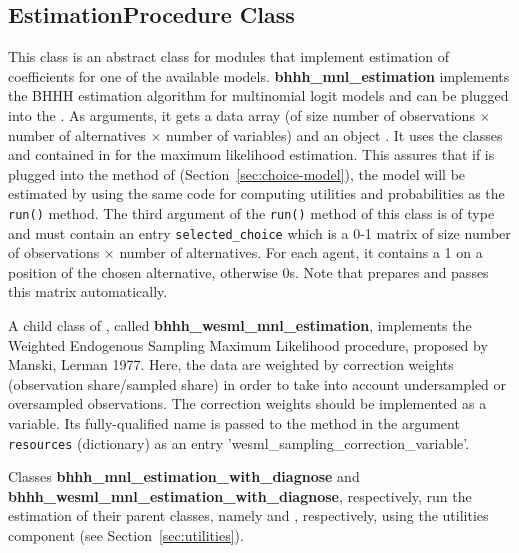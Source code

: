 \subsection{EstimationProcedure Class}
\label{sec:estimation-procedure}
%
This class is an abstract class for modules that implement estimation of
coefficients for one of the available models. {\bf bhhh_mnl_estimation}
implements the BHHH estimation algorithm for multinomial logit models and can
be plugged into the . As arguments, it gets a data array (of size number
of observations $\times$ number of alternatives $\times$ number of variables)
and an object . It uses the classes
 and  contained in 
for the maximum likelihood estimation. This assures that if
 is plugged into the  method of
 (Section~\ref{sec:choice-model}), the model will be
estimated by using the same code for computing utilities and probabilities as
the \verb|run()| method.  The third argument of the \verb|run()| method of
this class is of type  and must contain an entry
\verb|selected_choice| which is a 0-1 matrix of size number of observations
$\times$ number of alternatives. For each agent, it contains a 1 on a position
of the chosen alternative, otherwise 0s. Note that 
prepares and passes this matrix automatically.

A child class of , called {\bf bhhh_wesml_mnl_estimation}, 
implements 
the Weighted Endogenous Sampling Maximum Likelihood procedure, proposed by Manski, Lerman 1977.
Here, the data are weighted by correction weights (observation share/sampled share) in order to take into account 
undersampled or oversampled observations. The correction weights should be implemented
as a variable. Its fully-qualified name is passed to the  method in the argument 
\verb|resources| (dictionary) as an entry 'wesml_sampling_correction_variable'.

Classes {\bf bhhh_mnl_estimation_with_diagnose} and {\bf bhhh_wesml_mnl_estimation_with_diagnose},
respectively, run the estimation of their parent classes, namely
 and , respectively, using 
the utilities component  (see Section~\ref{sec:utilities}).

